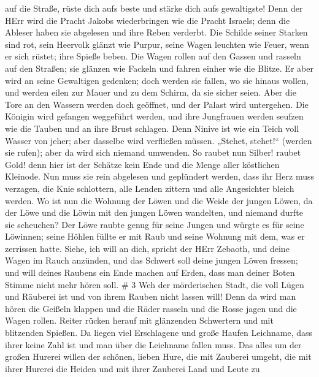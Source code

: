auf die Straße, rüste dich aufs beste und stärke dich aufs gewaltigste!
 Denn der HErr wird die Pracht Jakobs wiederbringen wie die
Pracht Israels; denn die Ableser haben sie abgelesen und ihre Reben
verderbt.  Die Schilde seiner Starken sind rot, sein
Heervolk glänzt wie Purpur, seine Wagen leuchten wie Feuer, wenn er sich
rüstet; ihre Spieße beben.  Die Wagen rollen auf den Gassen
und rasseln auf den Straßen; sie glänzen wie Fackeln und fahren einher
wie die Blitze.  Er aber wird an seine Gewaltigen gedenken;
doch werden sie fallen, wo sie hinaus wollen, und werden eilen zur Mauer
und zu dem Schirm, da sie sicher seien.  Aber die Tore an
den Wassern werden doch geöffnet, und der Palast wird untergehen.
 Die Königin wird gefangen weggeführt werden, und ihre
Jungfrauen werden seufzen wie die Tauben und an ihre Brust schlagen.
 Denn Ninive ist wie ein Teich voll Wasser von jeher; aber
dasselbe wird verfließen müssen. „Stehet, stehet!{}`` (werden sie
rufen); aber da wird sich niemand umwenden.  So raubet nun
Silber! raubet Gold! denn hier ist der Schätze kein Ende und die Menge
aller köstlichen Kleinode.  Nun muss sie rein abgelesen und
geplündert werden, dass ihr Herz muss verzagen, die Knie schlottern,
alle Lenden zittern und alle Angesichter bleich werden.  Wo
ist nun die Wohnung der Löwen und die Weide der jungen Löwen, da der
Löwe und die Löwin mit den jungen Löwen wandelten, und niemand durfte
sie scheuchen?  Der Löwe raubte genug für seine Jungen und
würgte es für seine Löwinnen; seine Höhlen füllte er mit Raub und seine
Wohnung mit dem, was er zerrissen hatte.  Siehe, ich will
an dich, spricht der HErr Zebaoth, und deine Wagen im Rauch anzünden,
und das Schwert soll deine jungen Löwen fressen; und will deines Raubens
ein Ende machen auf Erden, dass man deiner Boten Stimme nicht mehr hören
soll. \# 3  Weh der mörderischen Stadt, die voll Lügen und
Räuberei ist und von ihrem Rauben nicht lassen will!  Denn
da wird man hören die Geißeln klappen und die Räder rasseln und die
Rosse jagen und die Wagen rollen.  Reiter rücken herauf mit
glänzenden Schwertern und mit blitzenden Spießen. Da liegen viel
Erschlagene und große Haufen Leichname, dass ihrer keine Zahl ist und
man über die Leichname fallen muss.  Das alles um der großen
Hurerei willen der schönen, lieben Hure, die mit Zauberei umgeht, die
mit ihrer Hurerei die Heiden und mit ihrer Zauberei Land und Leute zu
